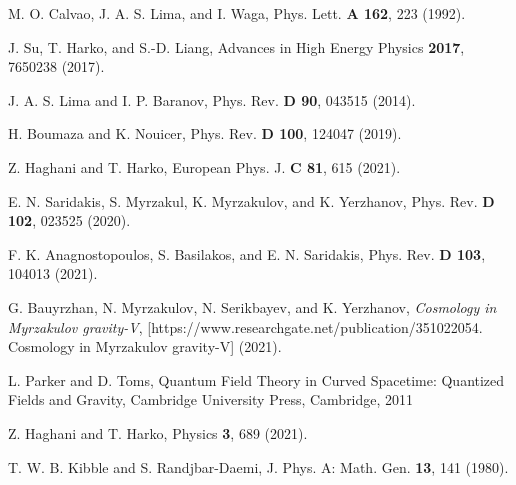 \documentclass[aps,superscriptaddress, showpacs,preprintnumbers, superscriptaddress, nofootinbibt,twocolumn]{revtex4}
\begin{document}
\begin{thebibliography}{99}
 M. O. Calvao, J. A. S. Lima, and I. Waga, Phys. Lett. 
\textbf{A 162}, 223 (1992).

 J. Su, T. Harko, and S.-D. Liang, Advances in High Energy
Physics \textbf{2017}, 7650238 (2017).

 J. A. S. Lima and I. P. Baranov, Phys. Rev.  \textbf{D 90},
043515 (2014).

 H. Boumaza and K. Nouicer, Phys. Rev. {\bf D 100},  124047 (2019).

 Z. Haghani and T. Harko, European Phys. J.  {\bf C 81}, 615 (2021).

 E. N. Saridakis, S.  Myrzakul, K. Myrzakulov, and K. Yerzhanov, Phys. Rev. {\bf D 102}, 023525 (2020).

 F. K. Anagnostopoulos,  S.  Basilakos, and E. N. Saridakis,  Phys. Rev. {\bf D 103}, 104013 (2021).

  G. Bauyrzhan, N.  Myrzakulov, N. Serikbayev, and K.  Yerzhanov, \textit{Cosmology in Myrzakulov gravity-V}, [https://www.researchgate.net/publication/351022054. Cosmology in Myrzakulov gravity-V] (2021).
    
 L. Parker and D. Toms, Quantum Field Theory in Curved Spacetime:
Quantized Fields and Gravity, Cambridge University Press, Cambridge, 2011    
    
 Z. Haghani and T. Harko, Physics {\bf 3},  689 (2021).
    
 T. W. B. Kibble and S. Randjbar-Daemi, J. Phys. A:
Math. Gen. {\bf 13}, 141 (1980).
\end{thebibliography}

 
\end{document}
